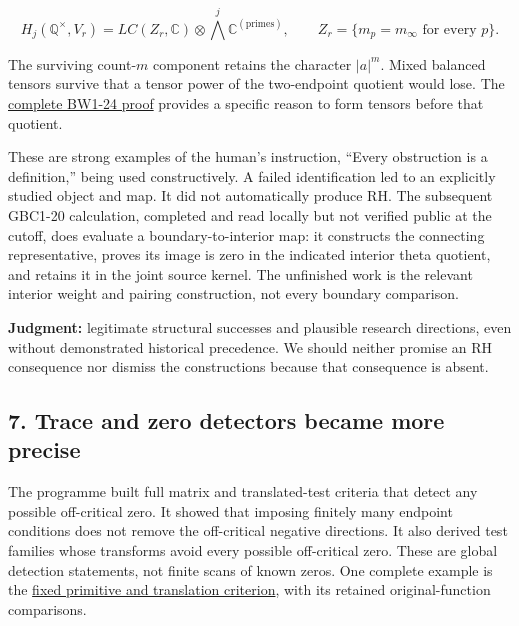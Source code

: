 \documentclass[
  british,
  11pt,
  a4paper,
]{article}
\begin{document}
\[H_j(\mathbb Q^\times,V_r)=LC(Z_r,\mathbb C)\otimes\bigwedge^j\mathbb C^{(\mathrm{primes})},\qquad Z_r=\{m_p=m_\infty\text{ for every }p\}.\]

The surviving count-\(m\) component retains the character \(|a|^m\).
Mixed balanced tensors survive that a tensor power of the two-endpoint
quotient would lose. The
\href{https://github.com/KokunoYumeto/zeta-function-research-reader/blob/e1dc06aa68bb810cf7d8b0006942f5b036b8b765/workbenches/splitzero-tandem/continuations/20260923-retained-source-readers/all-prime-boundary-weights/ROOT_BOUNDARY_WEIGHT_HOMOLOGY.tex}{complete
BW1-24 proof} provides a specific reason to form tensors before that
quotient.

These are strong examples of the human's instruction, ``Every
obstruction is a definition,'' being used constructively. A failed
identification led to an explicitly studied object and map. It did not
automatically produce RH. The subsequent GBC1-20 calculation, completed
and read locally but not verified public at the cutoff, does evaluate a
boundary-to-interior map: it constructs the connecting representative,
proves its image is zero in the indicated interior theta quotient, and
retains it in the joint source kernel. The unfinished work is the
relevant interior weight and pairing construction, not every boundary
comparison.

\textbf{Judgment:} legitimate structural successes and plausible
research directions, even without demonstrated historical precedence. We
should neither promise an RH consequence nor dismiss the constructions
because that consequence is absent.

\subsection{7. Trace and zero detectors became more
precise}\label{trace-and-zero-detectors-became-more-precise}

The programme built full matrix and translated-test criteria that detect
any possible off-critical zero. It showed that imposing finitely many
endpoint conditions does not remove the off-critical negative
directions. It also derived test families whose transforms avoid every
possible off-critical zero. These are global detection statements, not
finite scans of known zeros. One complete example is the
\href{https://github.com/KokunoYumeto/zeta-function-research-reader/blob/e1dc06aa68bb810cf7d8b0006942f5b036b8b765/workbenches/splitzero-tandem/branches/tau-zero-prime-positivity/UNIVERSAL_PRIMITIVE_TRANSLATION_CRITERION.md}{fixed
primitive and translation criterion}, with its retained
original-function comparisons.
\end{document}
